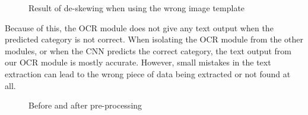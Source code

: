 \begin{figure}[h]
    \caption{Result of de-skewing when using the wrong image template}
    \label{fig:scuffedmatchresult}
\end{figure}

Because of this, the OCR module does not give any text output when the predicted category is not correct.
When isolating the OCR module from the other modules, or when the CNN predicts the correct category, the text output from our OCR module is mostly accurate.
However, small mistakes in the text extraction can lead to the wrong piece of data being extracted or not found at all.

\begin{figure}[h]
    \caption{Before and after pre-processing}
    \label{fig:beforeaftepreprocess}
\end{figure}


